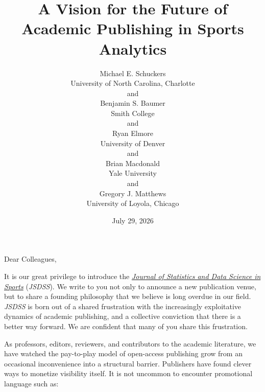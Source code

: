 \documentclass[
  12pt]{article}
\begin{document}
\def\spacingset#1{\renewcommand{\baselinestretch}%
{#1}\small\normalsize} \spacingset{1}



\date{July 29, 2026}
\title{\bf A Vision for the Future of Academic Publishing in Sports
Analytics}
\author{
Michael E. Schuckers\\
University of North Carolina, Charlotte\\
and\\Benjamin S. Baumer\\
Smith College\\
and\\Ryan Elmore\\
University of Denver\\
and\\Brian Macdonald\\
Yale University\\
and\\Gregory J. Matthews\\
University of Loyola, Chicago\\
}
\maketitle

\bigskip
\bigskip
\begin{abstract}

\end{abstract}


\newpage
\spacingset{1.9} %


Dear Colleagues,

It is our great privilege to introduce the
\href{https://jsds-sports.github.io/}{\emph{Journal of Statistics and
Data Science in Sports}} (\emph{JSDSS}). We write to you not only to
announce a new publication venue, but to share a founding philosophy
that we believe is long overdue in our field. \emph{JSDSS} is born out
of a shared frustration with the increasingly exploitative dynamics of
academic publishing, and a collective conviction that there is a better
way forward. We are confident that many of you share this frustration.

As professors, editors, reviewers, and contributors to the academic
literature, we have watched the pay-to-play model of open-access
publishing grow from an occasional inconvenience into a structural
barrier. Publishers have found clever ways to monetize visibility
itself. It is not uncommon to encounter promotional language such as:
\end{document}
